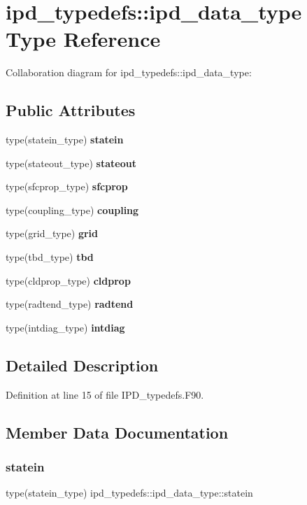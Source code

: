 \section{ipd\+\_\+typedefs\+:\+:ipd\+\_\+data\+\_\+type Type Reference}
\label{structipd__typedefs_1_1ipd__data__type}


Collaboration diagram for ipd\+\_\+typedefs\+:\+:ipd\+\_\+data\+\_\+type\+:
\subsection*{Public Attributes}
\begin{DoxyCompactItemize}
\item 
type(statein\+\_\+type) \textbf{ statein}
\item 
type(stateout\+\_\+type) \textbf{ stateout}
\item 
type(sfcprop\+\_\+type) \textbf{ sfcprop}
\item 
type(coupling\+\_\+type) \textbf{ coupling}
\item 
type(grid\+\_\+type) \textbf{ grid}
\item 
type(tbd\+\_\+type) \textbf{ tbd}
\item 
type(cldprop\+\_\+type) \textbf{ cldprop}
\item 
type(radtend\+\_\+type) \textbf{ radtend}
\item 
type(intdiag\+\_\+type) \textbf{ intdiag}
\end{DoxyCompactItemize}


\subsection{Detailed Description}


Definition at line 15 of file I\+P\+D\+\_\+typedefs.\+F90.



\subsection{Member Data Documentation}
\mbox{\label{structipd__typedefs_1_1ipd__data__type_af2c0eab5f49488cdde5ab6e2bc3eb21c}} 
\subsubsection{statein}
{\footnotesize\ttfamily type(statein\+\_\+type) ipd\+\_\+typedefs\+::ipd\+\_\+data\+\_\+type\+::statein}



